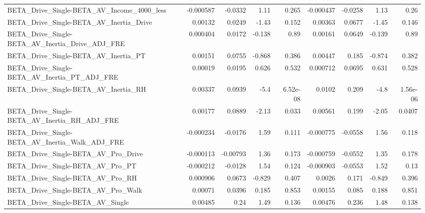 \begin{tabular}{lrrrrrrrr}
BETA\_Drive\_Single-BETA\_AV\_Income\_4000\_less         &   -0.000587 &      -0.0332 &     1.11 &    0.265 &  -0.000437 &     -0.0258 &         1.13 &          0.26 \\
BETA\_Drive\_Single-BETA\_AV\_Inertia\_Drive            &     0.00132 &       0.0249 &    -1.43 &    0.152 &    0.00363 &      0.0677 &        -1.45 &         0.146 \\
BETA\_Drive\_Single-BETA\_AV\_Inertia\_Drive\_ADJ\_FRE    &    0.000404 &       0.0172 &   -0.138 &     0.89 &    0.00161 &      0.0649 &       -0.139 &          0.89 \\
BETA\_Drive\_Single-BETA\_AV\_Inertia\_PT               &     0.00151 &       0.0755 &   -0.868 &    0.386 &    0.00447 &       0.185 &       -0.874 &         0.382 \\
BETA\_Drive\_Single-BETA\_AV\_Inertia\_PT\_ADJ\_FRE       &     0.00019 &       0.0195 &    0.626 &    0.532 &   0.000712 &      0.0695 &        0.631 &         0.528 \\
BETA\_Drive\_Single-BETA\_AV\_Inertia\_RH               &     0.00337 &       0.0939 &     -5.4 & 6.52e-08 &     0.0102 &       0.209 &         -4.8 &      1.56e-06 \\
BETA\_Drive\_Single-BETA\_AV\_Inertia\_RH\_ADJ\_FRE       &     0.00177 &       0.0889 &    -2.13 &    0.033 &    0.00561 &       0.199 &        -2.05 &        0.0407 \\
BETA\_Drive\_Single-BETA\_AV\_Inertia\_Walk\_ADJ\_FRE     &   -0.000234 &      -0.0176 &     1.59 &    0.111 &  -0.000775 &     -0.0558 &         1.56 &         0.118 \\
BETA\_Drive\_Single-BETA\_AV\_Pro\_Drive                &   -0.000113 &     -0.00793 &     1.36 &    0.173 &  -0.000759 &     -0.0552 &         1.35 &         0.178 \\
BETA\_Drive\_Single-BETA\_AV\_Pro\_PT                   &   -0.000212 &      -0.0128 &     1.54 &    0.124 &  -0.000903 &     -0.0553 &         1.52 &          0.13 \\
BETA\_Drive\_Single-BETA\_AV\_Pro\_RH                   &    0.000906 &       0.0673 &   -0.829 &    0.407 &     0.0026 &       0.171 &       -0.849 &         0.396 \\
BETA\_Drive\_Single-BETA\_AV\_Pro\_Walk                 &     0.00071 &       0.0396 &    0.185 &    0.853 &    0.00155 &       0.085 &        0.188 &         0.851 \\
BETA\_Drive\_Single-BETA\_AV\_Single                   &     0.00485 &         0.24 &     1.49 &    0.136 &    0.00476 &       0.236 &         1.48 &         0.138 \\

\end{tabular}
